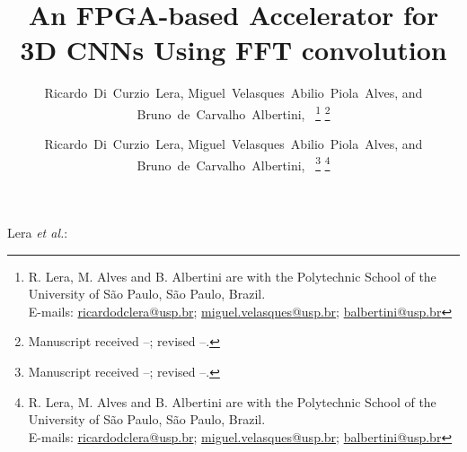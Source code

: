 \documentclass[
  10pt,
  \FORMAT-MODE,
  \REVIEW-MODE,
  \TWOSIDE-MODE
]{IEEEtran}
\newcommand*{\todo}[1]{\textcolor{red}{#1}}
\begin{document}

\title{An FPGA-based Accelerator for 3D CNNs Using FFT convolution}


\ifCLASSOPTIONcompsoc
  \author{
    Ricardo~Di~Curzio~Lera, 
    Miguel~Velasques~Abilio~Piola~Alves, and 
    Bruno~de~Carvalho~Albertini,~\IEEEmembership{\todo{Albertini membership},~IEEE}%
    \thanks{%
      R. Lera, M. Alves and B. Albertini are with the Polytechnic School of the University of São Paulo, São Paulo, Brazil.\protect\\
      E-mails: \href{mailto:ricardodclera@usp.br}{ricardodclera@usp.br}; \href{mailto:me@somewhere.com}{miguel.velasques@usp.br}; \href{mailto:me@somewhere.com}{balbertini@usp.br}%
    }%
    \thanks{Manuscript received --; revised --.}%
  }
\else
  \author{
    Ricardo~Di~Curzio~Lera, 
    Miguel~Velasques~Abilio~Piola~Alves, and 
    Bruno~de~Carvalho~Albertini,~\IEEEmembership{\todo{Albertini membership},~IEEE}%
    \thanks{Manuscript received --; revised --.}%
    \thanks{%
      R. Lera, M. Alves and B. Albertini are with the Polytechnic School of the University of São Paulo, São Paulo, Brazil.\protect\\
      E-mails: \href{mailto:ricardodclera@usp.br}{ricardodclera@usp.br}; \href{mailto:me@somewhere.com}{miguel.velasques@usp.br}; \href{mailto:me@somewhere.com}{balbertini@usp.br}%
    }%
  }
\fi

\makeatletter
\ifCLASSOPTIONjournal
  {Lera \MakeLowercase{\textit{et al.}}: \@title}
\else
  {\@title}
\fi
\makeatother

\ifCLASSOPTIONjournal
\fi

\end{document}
